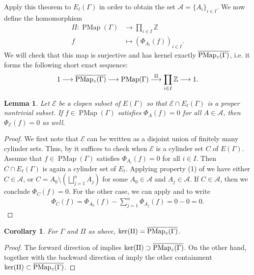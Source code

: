 \documentclass[11pt]{amsart}
\theoremstyle{plain}
\newtheorem{LEM}[THM]{Lemma}
\newtheorem{COR}[THM]{Corollary}
\theoremstyle{definition}
\DeclareMathOperator{\PMap}{PMap}
\DeclareMathOperator{\PMapc}{PMap_{\it c}}
\newcommand{\Z}{\mathbb{Z}}
\newcommand{\cE}{\mathcal{E}}
\newcommand{\cA}{\mathcal{A}}
\def\G{{\Gamma}}
\newcommand{\<}{\langle}
\renewcommand{\>}{\rangle}
\begin{document}
Apply this theorem to $E_{\ell}(\G)$ in order to obtain the set $\cA=\{A_i\}_{i \in I}$. We now define the homomorphism 
\begin{align*}
    \Pi: \PMap(\G) &\rightarrow \prod_{i \in I} \Z \\
    f &\mapsto (\Phi_{A_{i}}(f))_{i \in I}.
\end{align*}
We will check that this map is surjective and has kernel exactly $\overline{\PMapc(\G)}$, i.e. it forms the following short exact sequence:
\begin{align*}
    1 \longrightarrow \overline{\PMapc(\G)} \longrightarrow \PMap(\G) \overset{\Pi}{\longrightarrow} \prod_{i \in I} \Z \longrightarrow 1.
\end{align*}

\begin{LEM}\label{lem:zerofluxbasis}
    Let $\cE$ be a clopen subset of $E(\G)$ so that $\cE \cap E_{\ell}(\G)$ is a proper nontrivial subset. If $f \in \PMap(\G)$ satisfies $\Phi_{A} (f) = 0$ for all $A \in \cA$, then $\Phi_{\cE}(f) = 0$ as well. 
\end{LEM}

\begin{proof}
    We first note that $\cE$ can be written as a disjoint union of finitely many cylinder sets. Thus, by  it suffices to check when $\cE$ is a cylinder set $C$ of $E(\G)$.
    Assume that $f \in \PMap(\G)$ satisfies $\Phi_{A_{i}} (f) = 0$ for all $i \in I$. Then $C\cap E_{\ell}(\G)$ is again a cylinder set of $E_{\ell}$. Applying property (1) of  we have either $C \in \cA$, or $C = A_{0} \setminus (\bigsqcup_{j=1}^{n} A_{j})$ for some $A_{0} \in \cA$ and $A_j \in \cA$. If $C \in \cA$, then we conclude $\Phi_C(f)=0$. For the other case, we can apply  and  to write
    \begin{align*}
        \Phi_{C} (f) = \Phi_{A_{0}}(f) - \sum_{j=1}^{n} \Phi_{A_{j}}(f) = 0 - 0 =0. 
    \end{align*}
\end{proof}

\begin{COR} \label{cor:kernelpi}
    For $\G$ and $\Pi$ as above, $\ker(\Pi) = \overline{\PMapc(\G)}$. 
\end{COR}

\begin{proof}
The forward direction of  implies $\ker(\Pi) \supset \overline{\PMapc(\G)}$. On the other hand,  together with the backward direction of  imply the other containment $\ker(\Pi) \subset \overline{\PMapc(\G)}$.
\end{proof}
\end{document}
